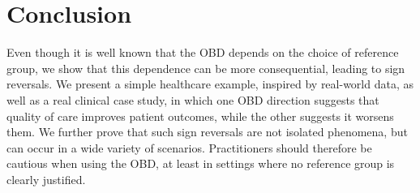 \section{Conclusion}
\label{sec:conclusion}

Even though it is well known that the OBD depends on the choice of reference group, we show that this dependence can be more consequential, leading to sign reversals.
We present a simple healthcare example, inspired by real-world data, as well as a real clinical case study, in which one OBD direction suggests that quality of care improves patient outcomes, while the other suggests it worsens them. 
We further prove that such sign reversals are not isolated phenomena, but can occur in a wide variety of scenarios. 
Practitioners should therefore be cautious when using the OBD, at least in settings where no reference group is clearly justified.
